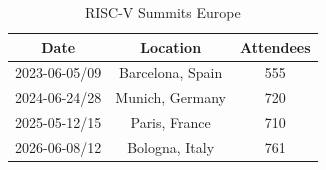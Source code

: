 \begin{table}[h]
  \small
  \centering
  \caption{RISC-V Summits Europe}
  \label{table-summits}
  \begin{tabular}{ccc}
    \toprule\toprule
    \bf Date & \bf Location & \bf Attendees \\
    \midrule\midrule
    2023-06-05/09 & Barcelona, Spain & 555 \\
    \midrule
    2024-06-24/28 & Munich, Germany & 720 \\
    \midrule
    2025-05-12/15 & Paris, France & 710 \\
    \midrule
    2026-06-08/12 & Bologna, Italy & 761 \\
    \bottomrule\bottomrule
  \end{tabular}
\end{table}
